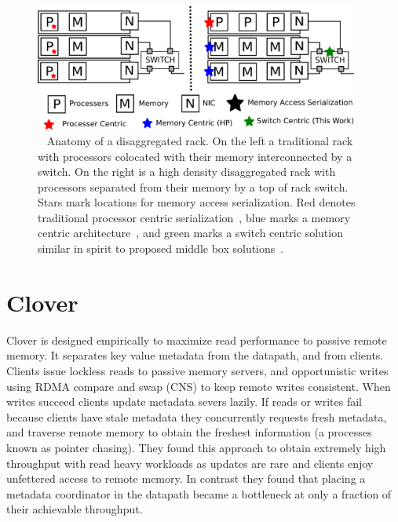 
\begin{figure}
      \centering
      \includegraphics[width=0.95\textwidth]{fig/overview.png}
      \caption{~
      Anatomy of a disaggregated rack. On the left a
      traditional rack with processors colocated with their memory
      interconnected by a switch. On the right is a high density
      disaggregated rack with processors separated from their memory
      by a top of rack switch. Stars mark locations for memory access
      serialization. Red denotes traditional processor centric
      serialization~\cite{memc3, cell, sonuma, storm, clover}, blue marks a
      memory centric architecture~\cite{aguilera2019designing}, and
      green marks a switch centric solution similar in spirit to
      proposed middle box solutions~\cite{254120}.
      \label{fig:overview}
      }
\end{figure}

\section{Clover}


Clover is designed empirically to maximize read performance to passive
remote memory. It separates key value metadata from the datapath, and
from clients. Clients issue lockless reads to passive memory servers,
and opportunistic writes using RDMA compare and swap (CNS) to keep
remote writes consistent. When writes succeed clients update metadata
severs lazily. If reads or writes fail because clients have stale
metadata they concurrently requests fresh metadata, and traverse
remote memory to obtain the freshest information (a processes known as
pointer chasing). They found this approach to obtain extremely high
throughput with read heavy workloads as updates are rare and clients
enjoy unfettered access to remote memory. In contrast they found that
placing a metadata coordinator in the datapath became a bottleneck at
only a fraction of their achievable throughput.


